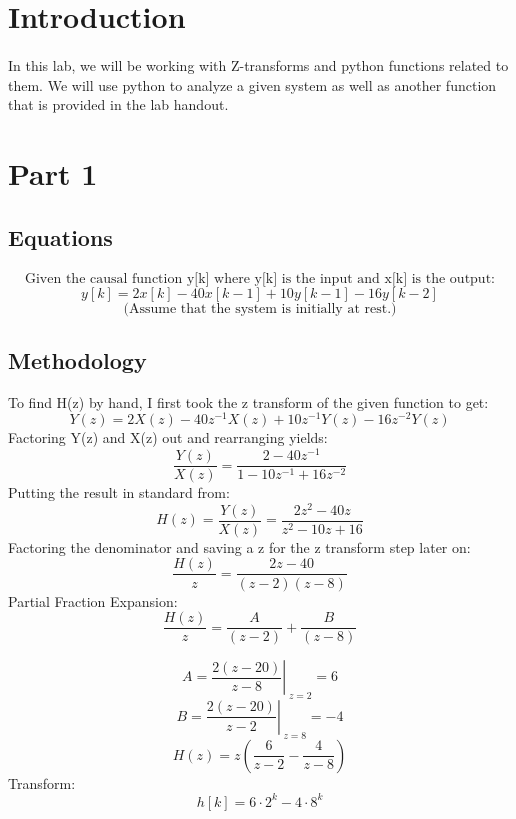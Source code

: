 \tableofcontents

\newpage
\section{Introduction}
\paragraph{}
In this lab, we will be working with Z-transforms and python functions related to them.  We will use python to analyze a given system as well as another function that is provided in the lab handout.


\section{Part 1}

\subsection{Equations}
\paragraph{}
\[\text{Given the causal function y[k] where y[k] is the input and x[k] is the output:}\]
\[y[k] = 2x[k] − 40x[k − 1] + 10y[k − 1] − 16y[k − 2]\]
\[\text{(Assume that the system is initially at rest.)}\]


\subsection{Methodology}
To find H(z) by hand, I first took the z transform of the given function to get:
\[Y(z)=2X(z)-40z^{-1}X(z)+10z^{-1} Y(z)-16z^{-2} Y(z)\]
Factoring Y(z) and X(z) out and rearranging yields:
\[\dfrac{Y(z)}{X(z)}=\dfrac{2-40z^{-1}}{1-10z^{-1}+16z^{-2}}\]
Putting the result in standard from:
\[H(z)=\dfrac{Y(z)}{X(z)}=\dfrac{2z^{2}-40z}{z^{2}-10z+16}\]
Factoring the denominator and saving a z for the z transform step later on:
\[\dfrac{H(z)}{z}=\dfrac{2z-40}{(z-2)(z-8)}\]
Partial Fraction Expansion:
\[\dfrac{H(z)}{z}=\dfrac{A}{(z-2)}+\dfrac{B}{(z-8)}\]

\[\left.A=\dfrac{2(z-20)}{z-8}\right|_{\;z=2}=6\]
\[\left.B=\dfrac{2(z-20)}{z-2}\right|_{\;z=8}=-4\]
\[H(z)=z \left(\dfrac{6}{z-2}-\dfrac{4}{z-8} \right)\]
Transform:
\[h[k]=6\cdot2^{k}-4\cdot8^{k}\]

